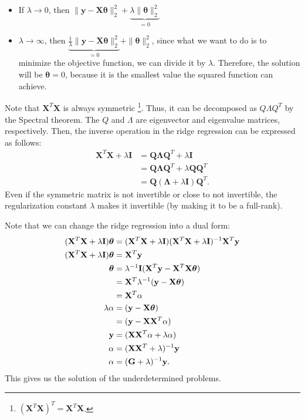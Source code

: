 \begin{itemize}
	\item If $\lambda\to 0$, then $\|\mathbf{y}-\mathbf{X}\boldsymbol{\theta}\|^2_2 + \underbrace{\lambda \|\boldsymbol{\theta}\|^2_2}_{=0}$ 
	\item $\lambda\to \infty$, then $\underbrace{\frac{1}{\lambda}\|\mathbf{y}-\mathbf{X}\boldsymbol{\theta}\|^2_2}_{=0} + \|\boldsymbol{\theta}\|^2_2$, since what we want to do is to minimize the objective function, we can divide it by $\lambda$. Therefore, the solution will be $\boldsymbol{\theta}=0$, because it is the smallest value the squared function can achieve. 
\end{itemize}
Note that $\mathbf{X}^T\mathbf{X}$ is always symmetric \footnote{$(\mathbf{X}^T\mathbf{X})^T = \mathbf{X}^T\mathbf{X}$.}. Thus, it can be decomposed as $Q\Lambda Q^T$ by the Spectral theorem. The $Q$ and $\Lambda$ are eigenvector and eigenvalue matrices, respectively. Then, the inverse operation in the ridge regression can be expressed as follows:
\begin{align*}
	\mathbf{X}^T\mathbf{X}+\lambda\mathbf{I} &= \mathbf{Q}\mathbf{\Lambda}\mathbf{Q}^T+\lambda\mathbf{I}\\
											 &= \mathbf{Q}\mathbf{\Lambda}\mathbf{Q}^T+\lambda\mathbf{Q}\mathbf{Q}^T\\
											 &= \mathbf{Q}(\mathbf{\Lambda}+\lambda\mathbf{I})\mathbf{Q}^T.
\end{align*}
Even if the symmetric matrix is not invertible or close to not invertible, the regularization constant $\lambda$ makes it invertible (by making it to be a full-rank). 

Note that we can change the ridge regression into a dual form:
\begin{align}
	(\mathbf{X}^T\mathbf{X}+\lambda\mathbf{I})\boldsymbol{\theta}	&= (\mathbf{X}^T\mathbf{X}+\lambda\mathbf{I})(\mathbf{X}^T\mathbf{X}+\lambda\mathbf{I})^{-1}\mathbf{X}^T{\mathbf{y}}\\
	(\mathbf{X}^T\mathbf{X}+\lambda\mathbf{I})\boldsymbol{\theta} &= \mathbf{X}^T{\mathbf{y}}\\ 
	\boldsymbol{\theta} &= \lambda^{-1}\mathbf{I}(\mathbf{X}^T{\mathbf{y}}-\mathbf{X}^T\mathbf{X}\boldsymbol{\theta})\\
	&= \mathbf{X}^T\lambda^{-1}({\mathbf{y}}-\mathbf{X}\boldsymbol{\theta})\\
	&= \mathbf{X}^T\alpha\\
	\lambda\alpha &= ({\mathbf{y}}-\mathbf{X}\boldsymbol{\theta})\\
	&= ({\mathbf{y}}-\mathbf{X}\mathbf{X}^T\alpha)\\
	{\mathbf{y}} &= (\mathbf{X}\mathbf{X}^T\alpha+\lambda\alpha)\\
	\alpha &= (\mathbf{X}\mathbf{X}^T+\lambda)^{-1}{\mathbf{y}}\\
	\alpha &= (\mathbf{G}+\lambda)^{-1}{\mathbf{y}}.
	\label{eq:dual_regression}
\end{align}
This gives us the solution of the underdetermined problems.  



